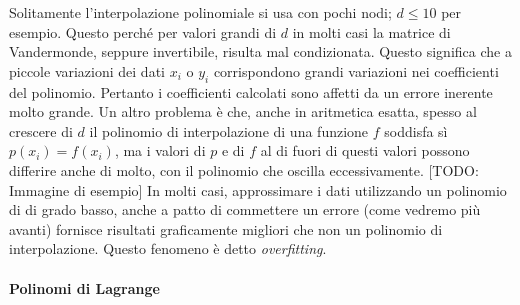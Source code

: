 \documentclass[a4paper]{report}
\theoremstyle{definiton}
\theoremstyle{remark}
\begin{document}
Solitamente l'interpolazione polinomiale si usa con pochi nodi; $d \leq 10$ per esempio. Questo perché per valori grandi di $d$ in molti casi la matrice di Vandermonde, seppure invertibile, risulta mal condizionata. Questo significa che a piccole variazioni dei dati $x_i$ o $y_i$ corrispondono grandi variazioni nei coefficienti del polinomio. Pertanto i coefficienti calcolati sono affetti da un errore inerente molto grande. Un altro problema è che, anche in aritmetica esatta, spesso al crescere di $d$ il polinomio di interpolazione di una funzione $f$ soddisfa sì $p(x_i)=f(x_i)$, ma i valori di $p$ e di $f$ al di fuori di questi valori possono differire anche di molto, con il polinomio che oscilla eccessivamente. [TODO: Immagine di esempio] In molti casi, approssimare i dati utilizzando un polinomio di di grado basso, anche a patto di commettere un errore (come vedremo più avanti) fornisce risultati graficamente migliori che non un polinomio di interpolazione. Questo fenomeno è detto \emph{overfitting}.

\paragraph{Polinomi di Lagrange}
\end{document}
